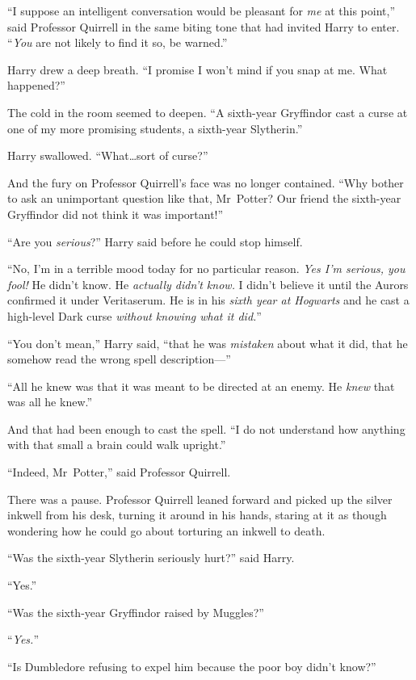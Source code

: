 “I suppose an intelligent conversation would be pleasant for \emph{me} at this point,” said Professor Quirrell in the same biting tone that had invited Harry to enter. “\emph{You} are not likely to find it so, be warned.”

Harry drew a deep breath. “I promise I won’t mind if you snap at me. What happened?”

The cold in the room seemed to deepen. “A sixth-year Gryffindor cast a curse at one of my more promising students, a sixth-year Slytherin.”

Harry swallowed. “What…sort of curse?”

And the fury on Professor Quirrell’s face was no longer contained. “Why bother to ask an unimportant question like that, Mr~Potter? Our friend the sixth-year Gryffindor did not think it was important!”

“Are you \emph{serious}?” Harry said before he could stop himself.

“No, I’m in a terrible mood today for no particular reason. \emph{Yes I’m serious, you fool!} He didn’t know. He \emph{actually didn’t know.} I didn’t believe it until the Aurors confirmed it under Veritaserum. He is in his \emph{sixth year at Hogwarts} and he cast a high-level Dark curse \emph{without knowing what it did.}”

“You don’t mean,” Harry said, “that he was \emph{mistaken} about what it did, that he somehow read the wrong spell description—”

“All he knew was that it was meant to be directed at an enemy. He \emph{knew} that was all he knew.”

And that had been enough to cast the spell. “I do not understand how anything with that small a brain could walk upright.”

“Indeed, Mr~Potter,” said Professor Quirrell.

There was a pause. Professor Quirrell leaned forward and picked up the silver inkwell from his desk, turning it around in his hands, staring at it as though wondering how he could go about torturing an inkwell to death.

“Was the sixth-year Slytherin seriously hurt?” said Harry.

“Yes.”

“Was the sixth-year Gryffindor raised by Muggles?”

“\emph{Yes.}”

“Is Dumbledore refusing to expel him because the poor boy didn’t know?”

